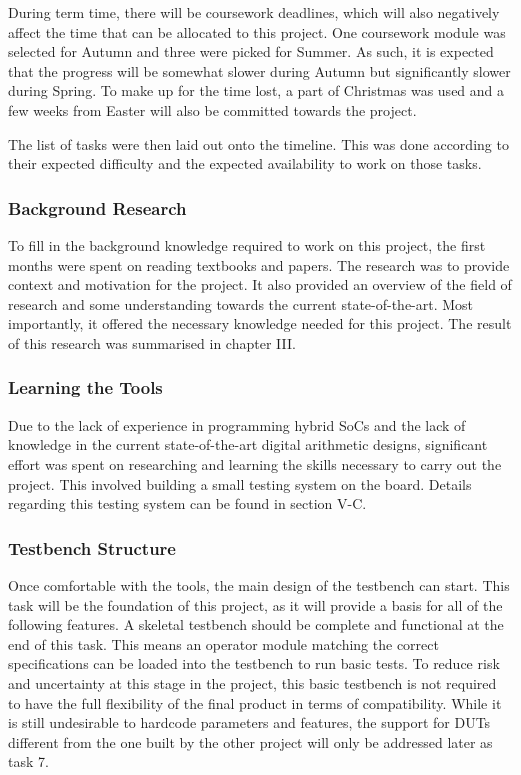 During term time, there will be coursework deadlines, which will also
negatively affect the time that can be allocated to this project.
One coursework module was selected for Autumn and three were picked for Summer.
As such, it is expected that the progress will be somewhat slower during Autumn
but significantly slower during Spring.
To make up for the time lost, a part of Christmas was used and a few weeks
from Easter will also be committed towards the project.

The list of tasks were then laid out onto the timeline.
This was done according to their expected difficulty and the expected
availability to work on those tasks.

\subsubsection{\textbf{Background Research}}
To fill in the background knowledge required to work on this project, the first
months were spent on reading textbooks and papers.
The research was to provide context and motivation for the project.
It also provided an overview of the field of research and some understanding
towards the current state-of-the-art.
Most importantly, it offered the necessary knowledge needed for this project.
The result of this research was summarised in chapter III.

\subsubsection{\textbf{Learning the Tools}}
Due to the lack of experience in programming hybrid SoCs and the lack of
knowledge in the current state-of-the-art digital arithmetic designs,
significant effort was spent on researching and learning the skills
necessary to carry out the project.
This involved building a small testing system on the board.
Details regarding this testing system can be found in section V-C.

\subsubsection{\textbf{Testbench Structure}}
Once comfortable with the tools, the main design of the testbench can start.
This task will be the foundation of this project, as it will provide a basis
for all of the following features.
A skeletal testbench should be complete and functional at the end of this
task.
This means an operator module matching the correct specifications can
be loaded into the testbench to run basic tests.
To reduce risk and uncertainty at this stage in the project, this basic
testbench is not required to have the full flexibility of the final product
in terms of compatibility.
While it is still undesirable to hardcode parameters and features,
the support for DUTs different from the one built by the other project will
only be addressed later as task 7.

